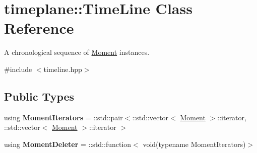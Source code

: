 \hypertarget{classtimeplane_1_1_time_line}{}\section{timeplane\+:\+:Time\+Line Class Reference}
\label{classtimeplane_1_1_time_line}


A chronological sequence of {\ttfamily \hyperlink{classtimeplane_1_1_moment}{Moment}} instances.  




{\ttfamily \#include $<$timeline.\+hpp$>$}

\subsection*{Public Types}
\begin{DoxyCompactItemize}
\item 
\mbox{\label{classtimeplane_1_1_time_line_a6f6445b9dc0cafb2affc5f146aa2d5c9}} 
using {\bfseries Moment\+Iterators} = \+::std\+::pair$<$\+::std\+::vector$<$ \hyperlink{classtimeplane_1_1_moment}{Moment} $>$\+::iterator, \+::std\+::vector$<$ \hyperlink{classtimeplane_1_1_moment}{Moment} $>$\+::iterator $>$
\item 
\mbox{\label{classtimeplane_1_1_time_line_ac0192758efee9819ae91308d339fc3f4}} 
using {\bfseries Moment\+Deleter} = \+::std\+::function$<$ void(typename Moment\+Iterators)$>$
\end{DoxyCompactItemize}
